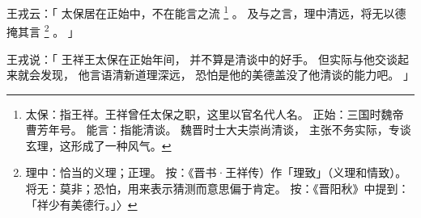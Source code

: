 
\switchcolumn*[\section{}]

王戎云：「
    太保居在正始中，不在能言之流%
    \footnote{%
        太保：指王祥。王祥曾任太保之职，这里以官名代人名。
        正始：三国时魏帝曹芳年号。
        能言：指能清谈。
              魏晋时士大夫崇尚清谈，
              主张不务实际，专谈玄理，这形成了一种风气。
    }%
    。
    及与之言，理中清远，将无以德掩其言%
    \footnote{%
        理中：恰当的义理；正理。
        按：《晋书·王祥传）作「理致」（义理和情致）。
        将无：莫非；恐怕，用来表示猜测而意思偏于肯定。
        按：《晋阳秋》中提到：「祥少有美德行。」〉
    }%
    。
」

\switchcolumn

王戎说：「
    王祥王太保在正始年间，
    并不算是清谈中的好手。
    但实际与他交谈起来就会发现，
    他言语清新道理深远，
    恐怕是他的美德盖没了他清谈的能力吧。
」


